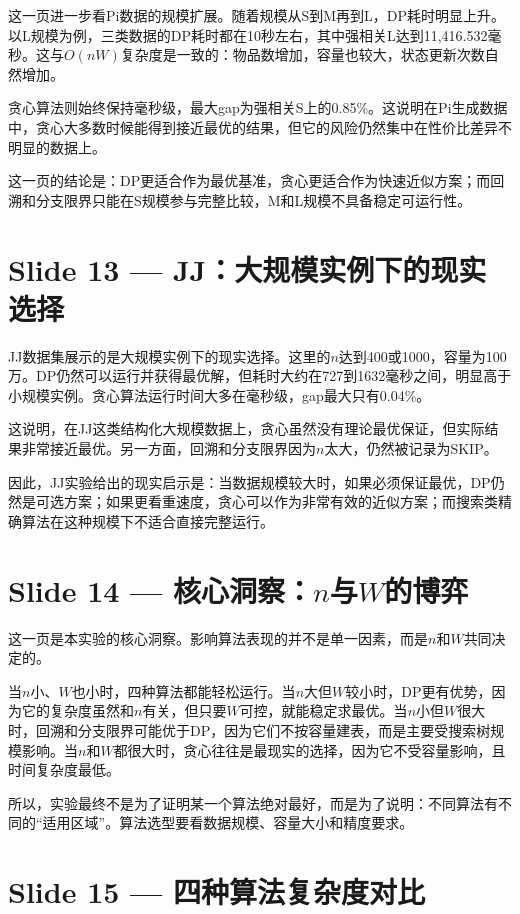 \documentclass[12pt,a4paper]{ctexart}
\begin{document}
这一页进一步看Pi数据的规模扩展。随着规模从S到M再到L，DP耗时明显上升。以L规模为例，三类数据的DP耗时都在10秒左右，其中强相关L达到11,416.532毫秒。这与$O(nW)$复杂度是一致的：物品数增加，容量也较大，状态更新次数自然增加。

贪心算法则始终保持毫秒级，最大gap为强相关S上的0.85\%。这说明在Pi生成数据中，贪心大多数时候能得到接近最优的结果，但它的风险仍然集中在性价比差异不明显的数据上。

这一页的结论是：DP更适合作为最优基准，贪心更适合作为快速近似方案；而回溯和分支限界只能在S规模参与完整比较，M和L规模不具备稳定可运行性。

\section*{Slide 13 — JJ：大规模实例下的现实选择}

JJ数据集展示的是大规模实例下的现实选择。这里的$n$达到400或1000，容量为100万。DP仍然可以运行并获得最优解，但耗时大约在727到1632毫秒之间，明显高于小规模实例。贪心算法运行时间大多在毫秒级，gap最大只有0.04\%。

这说明，在JJ这类结构化大规模数据上，贪心虽然没有理论最优保证，但实际结果非常接近最优。另一方面，回溯和分支限界因为$n$太大，仍然被记录为SKIP。

因此，JJ实验给出的现实启示是：当数据规模较大时，如果必须保证最优，DP仍然是可选方案；如果更看重速度，贪心可以作为非常有效的近似方案；而搜索类精确算法在这种规模下不适合直接完整运行。

\section*{Slide 14 — 核心洞察：$n$与$W$的博弈}

这一页是本实验的核心洞察。影响算法表现的并不是单一因素，而是$n$和$W$共同决定的。

当$n$小、$W$也小时，四种算法都能轻松运行。当$n$大但$W$较小时，DP更有优势，因为它的复杂度虽然和$n$有关，但只要$W$可控，就能稳定求最优。当$n$小但$W$很大时，回溯和分支限界可能优于DP，因为它们不按容量建表，而是主要受搜索树规模影响。当$n$和$W$都很大时，贪心往往是最现实的选择，因为它不受容量影响，且时间复杂度最低。

所以，实验最终不是为了证明某一个算法绝对最好，而是为了说明：不同算法有不同的“适用区域”。算法选型要看数据规模、容量大小和精度要求。

\section*{Slide 15 — 四种算法复杂度对比}
\end{document}
